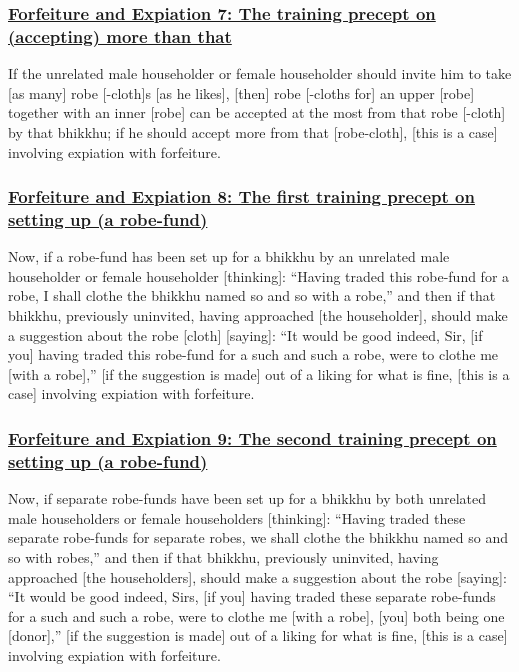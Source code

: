 \subsubsection*{\hyperref[np7]{Forfeiture and Expiation 7: The training precept on (accepting) more than that}}
\label{forf-exp7}

If the unrelated male householder or female householder should invite him to take [as many] robe [-cloth]s [as he likes], [then] robe [-cloths for] an upper [robe] together with an inner [robe] can be accepted at the most from that robe [-cloth] by that bhikkhu; if he should accept more from that [robe-cloth], [this is a case] involving expiation with forfeiture.



\subsubsection*{\hyperref[np8]{Forfeiture and Expiation 8: The first training precept on setting up (a robe-fund)}}
\label{forf-exp8}

Now, if a robe-fund has been set up for a bhikkhu by an unrelated male householder or female householder [thinking]: ``Having traded this robe-fund for a robe, I shall clothe the bhikkhu named so and so with a robe,'' and then if that bhikkhu, previously uninvited, having approached [the householder], should make a suggestion about the robe [cloth] [saying]: ``It would be good indeed, Sir, [if you] having traded this robe-fund for a such and such a robe, were to clothe me [with a robe],'' [if the suggestion is made] out of a liking for what is fine, [this is a case] involving expiation with forfeiture.



\subsubsection*{\hyperref[np9]{Forfeiture and Expiation 9: The second training precept on setting up (a robe-fund)}}
\label{forf-exp9}

Now, if separate robe-funds have been set up for a bhikkhu by both unrelated male householders or female householders [thinking]: ``Having traded these separate robe-funds for separate robes, we shall clothe the bhikkhu named so and so with robes,'' and then if that bhikkhu, previously uninvited, having approached [the householders], should make a suggestion about the robe [saying]: ``It would be good indeed, Sirs, [if you] having traded these separate robe-funds for a such and such a robe, were to clothe me [with a robe], [you] both being one [donor],'' [if the suggestion is made] out of a liking for what is fine, [this is a case] involving expiation with forfeiture.



